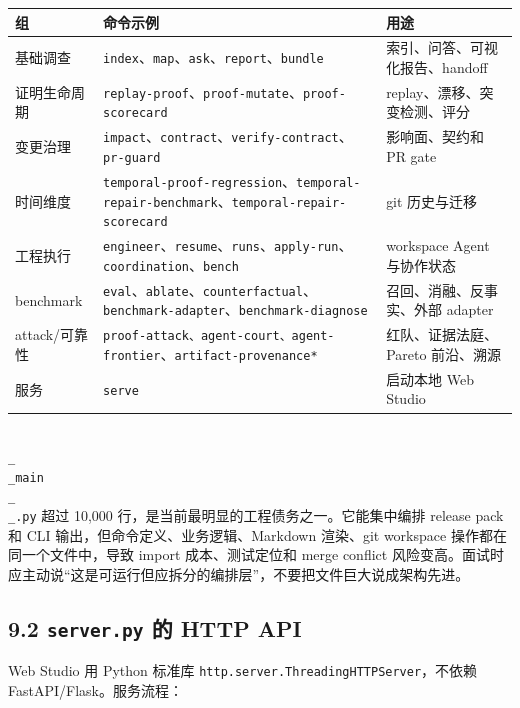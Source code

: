 \documentclass[UTF8,12pt,openany]{ctexbook}
\begin{document}
\begin{center}
\small
\begin{longtable}{|p{}|p{}|p{}|}
\toprule
组 & 命令示例 & 用途 \\
\midrule
基础调查 & \texttt{index}、\texttt{map}、\texttt{ask}、\texttt{report}、\texttt{bundle} & 索引、问答、可视化报告、handoff \\
证明生命周期 & \texttt{replay-proof}、\texttt{proof-mutate}、\texttt{proof-scorecard} & replay、漂移、突变检测、评分 \\
变更治理 & \texttt{impact}、\texttt{contract}、\texttt{verify-contract}、\texttt{pr-guard} & 影响面、契约和 PR gate \\
时间维度 & \texttt{temporal-proof-regression}、\texttt{temporal-repair-benchmark}、\texttt{temporal-repair-scorecard} & git 历史与迁移 \\
工程执行 & \texttt{engineer}、\texttt{resume}、\texttt{runs}、\texttt{apply-run}、\texttt{coordination}、\texttt{bench} & workspace Agent 与协作状态 \\
benchmark & \texttt{eval}、\texttt{ablate}、\texttt{counterfactual}、\texttt{benchmark-adapter}、\texttt{benchmark-diagnose} & 召回、消融、反事实、外部 adapter \\
attack/可靠性 & \texttt{proof-attack\emph{}、\texttt{agent-court}、\texttt{agent-frontier}}、\texttt{artifact-provenance*} & 红队、证据法庭、Pareto 前沿、溯源 \\
服务 & \texttt{serve} & 启动本地 Web Studio \\
\bottomrule
\end{longtable}
\end{center}

\texttt{\\_\\_main\\_\\_.py} 超过 10,000 行，是当前最明显的工程债务之一。它能集中编排 release pack 和 CLI 输出，但命令定义、业务逻辑、Markdown 渲染、git workspace 操作都在同一个文件中，导致 import 成本、测试定位和 merge conflict 风险变高。面试时应主动说“这是可运行但应拆分的编排层”，不要把文件巨大说成架构先进。\par

\subsection{9.2 \texttt{server.py} 的 HTTP API}

Web Studio 用 Python 标准库 \texttt{http.server.ThreadingHTTPServer}，不依赖 FastAPI/Flask。服务流程：\par
\end{document}
